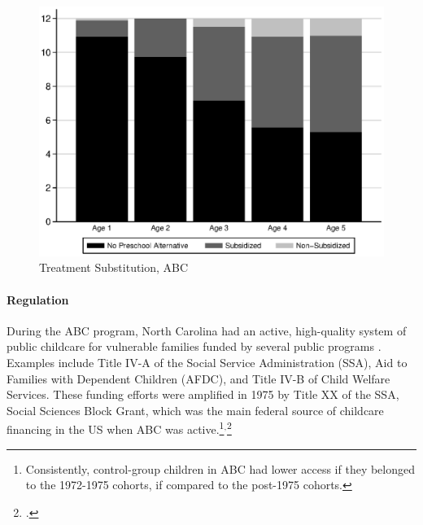\begin{appendices}
\begin{center}
	\begin{figure}[H]
		\caption{Treatment Substitution, ABC} \label{fig:ccabc}
		\centering
		\includegraphics[width=.9\columnwidth]{output/blackwhite_CCnumber.eps}
	\end{figure}
\end{center}

\paragraph{Regulation}

\noindent During the ABC program, North Carolina had an active, high-quality system of public childcare for vulnerable families funded by several public programs . Examples include Title IV-A of the Social Service Administration (SSA), Aid to Families with Dependent Children (AFDC), and Title IV-B of Child Welfare Services. These funding efforts were amplified in 1975 by Title XX of the SSA, Social Sciences Block Grant, which was the main federal source of childcare financing in the US when ABC was active.\footnote{Consistently, control-group children in ABC had lower access if they belonged to the 1972-1975 cohorts, if compared to the post-1975 cohorts.}$^{,}$\footnote{\citet{Robins_1988_Federal-Child-Care}.}\\


\end{appendices}
